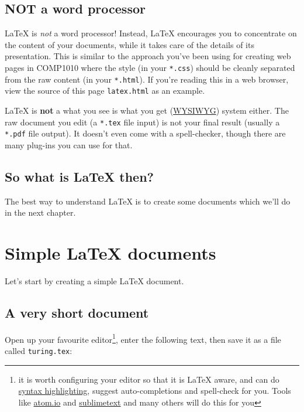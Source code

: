 \documentclass[
]{book}
\begin{document}
\hypertarget{not-a-word-processor}{%
\section{NOT a word processor}\label{not-a-word-processor}}

LaTeX is \emph{not} a word processor! Instead, LaTeX encourages you to concentrate on the content of your documents, while it takes care of the details of its presentation. This is similar to the approach you've been using for creating web pages in COMP1010 where the style (in your \texttt{*.css}) should be cleanly separated from the raw content (in your \texttt{*.html}). If you're reading this in a web browser, view the source of this page \texttt{latex.html} as an example.

LaTeX is \textbf{not} a what you see is what you get (\href{https://en.wikipedia.org/wiki/WYSIWYG}{WYSIWYG}) system either. The raw document you edit (a \texttt{*.tex} file input) is not your final result (usually a \texttt{*.pdf} file output). It doesn't even come with a spell-checker, though there are many plug-ins you can use for that.

\hypertarget{so-what-is-latex-then}{%
\section{So what is LaTeX then?}\label{so-what-is-latex-then}}

The best way to understand LaTeX is to create some documents which we'll do in the next chapter.

\hypertarget{simples}{%
\chapter{Simple LaTeX documents}\label{simples}}

Let's start by creating a simple LaTeX document.

\hypertarget{shortest}{%
\section{A very short document}\label{shortest}}

Open up your favourite editor\footnote{it is worth configuring your editor so that it is LaTeX aware, and can do \href{https://en.wikipedia.org/wiki/Syntax_highlighting}{syntax highlighting}, suggest auto-completions and spell-check for you. Tools like \href{https://atom.io/}{atom.io} and \href{https://www.sublimetext.com/}{sublimetext} and many others will do this for you}, enter the following text, then save it as a file called \texttt{turing.tex}:
\end{document}
